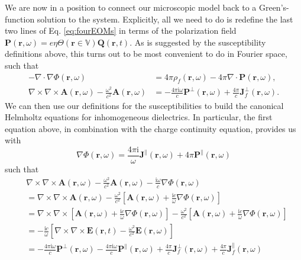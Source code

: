 We are now in a position to connect our microscopic model back to a Green's-function solution to the system. Explicitly, all we need to do is redefine the last two lines of Eq. \eqref{eq:fourEOMs} in terms of the polarization field $\mathbf{P}(\mathbf{r},\omega) = e\eta\Theta(\mathbf{r}\in\mathbb{V})\mathbf{Q}(\mathbf{r},t)$. As is suggested by the susceptibility definitions above, this turns out to be most convenient to do in Fourier space, such that
\begin{equation}
\begin{split}
-\nabla\cdot\nabla\Phi(\mathbf{r},\omega) &= 4\pi\rho_f(\mathbf{r},\omega) - 4\pi\nabla\cdot\mathbf{P}(\mathbf{r},\omega),\\
\nabla\times\nabla\times\mathbf{A}(\mathbf{r},\omega) - \frac{\omega^2}{c^2}\mathbf{A}(\mathbf{r},\omega) &= -\frac{4\pi\mathrm{i}\omega}{c}\mathbf{P}^\perp(\mathbf{r},\omega) + \frac{4\pi}{c}\mathbf{J}_f^\perp(\mathbf{r},\omega).
\end{split}
\end{equation}
We can then use our definitions for the susceptibilities to build the canonical Helmholtz equations for inhomogeneous dielectrics. In particular, the first equation above, in combination with the charge continuity equation, provides us with
\begin{equation}
\nabla\Phi(\mathbf{r},\omega) = \frac{4\pi\mathrm{i}}{\omega}\mathbf{J}^\parallel(\mathbf{r},\omega) + 4\pi\mathbf{P}^\parallel(\mathbf{r},\omega)
\end{equation}
such that
\begin{equation}
\begin{split}
&\nabla\times\nabla\times\mathbf{A}(\mathbf{r},\omega) - \frac{\omega^2}{c^2}\mathbf{A}(\mathbf{r},\omega) - \frac{\mathrm{i}\omega}{c}\nabla\Phi(\mathbf{r},\omega)\\
&= \nabla\times\nabla\times\mathbf{A}(\mathbf{r},\omega) - \frac{\omega^2}{c^2}\left[\mathbf{A}(\mathbf{r},\omega) + \frac{\mathrm{i}c}{\omega}\nabla\Phi(\mathbf{r},\omega)\right]\\
&= \nabla\times\nabla\times\left[\mathbf{A}(\mathbf{r},\omega) + \frac{\mathrm{i}c}{\omega}\nabla\Phi(\mathbf{r},\omega)\right] - \frac{\omega^2}{c^2}\left[\mathbf{A}(\mathbf{r},\omega) + \frac{\mathrm{i}c}{\omega}\nabla\Phi(\mathbf{r},\omega)\right]\\
&= -\frac{\mathrm{i}c}{\omega}\left[\nabla\times\nabla\times\mathbf{E}(\mathbf{r},t) - \frac{\omega^2}{c^2}\mathbf{E}(\mathbf{r},\omega)\right]\\
&= -\frac{4\pi\mathrm{i}\omega}{c}\mathbf{P}^\perp(\mathbf{r},\omega) - \frac{4\pi\mathrm{i}\omega}{c}\mathbf{P}^\parallel(\mathbf{r},\omega) + \frac{4\pi}{c}\mathbf{J}_f^\perp(\mathbf{r},\omega) + \frac{4\pi}{c}\mathbf{J}_f^\parallel(\mathbf{r},\omega)
\end{split}
\end{equation}
